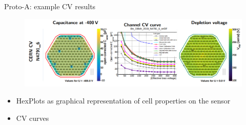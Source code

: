 \documentclass{beamer}
\begin{document}
\begin{frame}{Proto-A: example CV results}
  \begin{figure}
      \includegraphics[width=1.0\textwidth]{plots/CV_example.png}    
  \end{figure}
  \begin{itemize}
    \item HexPlots as graphical representation of cell properties on the sensor
    \item CV curves
  \end{itemize}
\end{frame}





\end{document}
